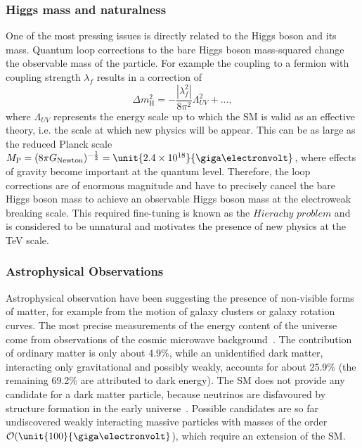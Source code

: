 \subsubsection*{Higgs mass and naturalness}
One of the most pressing issues is directly related to the Higgs boson and its mass. Quantum loop corrections to the bare Higgs boson mass-squared change the observable mass of the particle. For example the coupling to a fermion with coupling strength $\lambda_f$ results in a correction of
\begin{equation}
\Delta m_{\mathrm{H}}^2 = -\frac{|\lambda_f^2|}{8\pi^2}\Lambda_{UV}^2 + ...,
\end{equation}
where $\Lambda_{UV}$ represents the energy scale up to which the SM is valid as an effective theory, i.e. the scale at which new physics will be appear. This can be as large as the reduced Planck scale $M_\mathrm{P} = (8\pi G_{\mathrm{Newton}})^{-\frac{1}{2}} = \unit{2.4\times 10^{18}}{\giga\electronvolt}$, where effects of gravity become important at the quantum level. Therefore, the loop corrections are of enormous magnitude and have to precisely cancel the bare Higgs boson mass to achieve an observable Higgs boson mass at the electroweak breaking scale. This required fine-tuning is known as the  $\textit{Hierachy problem}$ and is considered to be unnatural and motivates the presence of new physics at the TeV scale.

\subsubsection*{Astrophysical Observations}
Astrophysical observation have been suggesting the presence of non-visible forms of matter, for example from the motion of galaxy clusters or galaxy rotation curves. The most precise measurements of the energy content of the universe come from observations of the cosmic microwave background~\cite{Adam:2015rua}. The contribution of ordinary matter is only about 4.9\%, while an unidentified dark matter, interacting only gravitational and possibly weakly, accounts for about 25.9\% (the remaining 69.2\% are attributed to dark energy). The SM does not provide any candidate for a dark matter particle, because neutrinos are disfavoured by structure formation in the early universe~\cite{PDG}. Possible candidates are so far undiscovered weakly interacting massive particles with masses of the order $\mathcal{O}(\unit{100}{\giga\electronvolt}$), which require an extension of the SM. 

